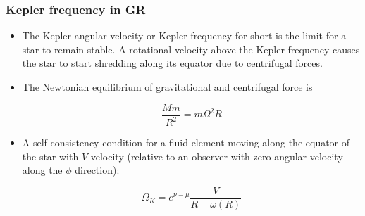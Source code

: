 \begin{frame}
\frametitle{Kepler frequency in GR}

\begin{itemize}
	\item The Kepler angular velocity or Kepler frequency for short is the limit for a star to remain stable. A rotational velocity above the Kepler frequency causes the star to start shredding along its equator due to centrifugal forces.
	\item The Newtonian equilibrium of gravitational and centrifugal force is
	\begin{block}{}
		\begin{equation}
			\frac{M m}{R^{2}}
			=
			m \Omega^{2} R
		\end{equation}
	\end{block}
	\item A self-consistency condition for a fluid element moving along the equator of the star with $V$ velocity (relative to an observer with zero angular velocity along the $\phi$ direction):
	\begin{block}{}
		\begin{equation}
			\Omega_{K}
			=
			e^{\nu - \mu} \frac{V}{R + \omega (R)}
		\end{equation}
	\end{block}
\end{itemize}

\end{frame}
